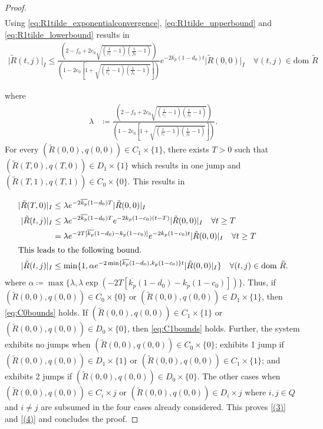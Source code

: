 \documentclass{article}
\newcommand{\dom}{\text{dom }}
\newcommand{\brackets}[1]{\left(#1\right)}
\newcommand{\Rtilde}{\tilde{R}}
\newcommand{\normSOthree}[1]{{{\vert}#1 {\vert}_I}}
\newcommand{\expo}[1]{e^{#1}}
\begin{document}
\begin{proof}
\begin{align}
\end{align}
Using \eqref{eq:R1tilde_exponentialconvergence}, \eqref{eq:R1tilde_upperbound} and \eqref{eq:R1tilde_lowerbound} results in
\begin{align}
    \normSOthree{\Rtilde(t,j)} \leq \frac{\brackets{2 - f_0 + 2e_0\sqrt{\brackets{\frac{1}{c_1}-1}\brackets{\frac{1}{f_0}-1}}}}{\brackets{1 - 2e_0\left[1 + \sqrt{\brackets{\frac{1}{c_1}-1}\brackets{\frac{1}{f_0}-1}}\right]}} \expo{-2\overline{k_p}(1-d_0)t}\normSOthree{\Rtilde(0,0)} \quad \forall (t,j)\in \dom \Rtilde
\end{align}
\begin{flushleft}
where 
\begin{align}
    \lambda &\coloneqq \frac{\brackets{2 - f_0 + 2e_0\sqrt{\brackets{\frac{1}{c_1}-1}\brackets{\frac{1}{f_0}-1}}}}{\brackets{1 - 2e_0\left[1 + \sqrt{\brackets{\frac{1}{c_1}-1}\brackets{\frac{1}{f_0}-1}}\right]}}. \label{eq:lambda}
\end{align}
For every ${(\Rtilde(0,0), q(0,0))}\in C_1\times\{1\}$, there exists $T > 0$ such that ${(\Rtilde(T,0), q(T,0))}\in D_1\times\{1\}$ which results in one jump and ${(\Rtilde(T,1), q(T,1))}\in C_0\times\{0\}$. This results in
\end{flushleft}
\begin{align}
    \normSOthree{\Rtilde(T,0)}&\leq \lambda \expo{-2\overline{k_p}(1-d_0)T}\normSOthree{\Rtilde(0,0)}\nonumber\\
    \normSOthree{\Rtilde(t,j)} &\leq \lambda \expo{-2\overline{k_p}(1-d_0)T} \expo{-2k_p(1-c_0)(t-T)}\normSOthree{\Rtilde(0,0)} \quad \forall t \geq T\nonumber\\
    &= \lambda \expo{-2T[\overline{k_p}(1-d_0) - k_p(1-c_0)]}\expo{-2k_p(1-c_0)t}\normSOthree{\Rtilde(0,0)} \quad \forall t\geq T\nonumber\\
    \intertext{This leads to the following bound.}
    \normSOthree{\Rtilde(t,j)}&\leq \min\{1, \alpha\expo{-2\min\{\overline{k_p}(1-d_0), k_p(1-c_0)\} t}\normSOthree{\Rtilde(0,0)}\} \quad \forall (t,j) \in \dom\Rtilde. \label{eq:C1bounds}
    \end{align}
where $\alpha \coloneqq \max\{\lambda, \lambda \exp{(-2T[\overline{k_p}(1-d_0) - k_p(1-c_0)])}\}$. Thus, if ${(\Rtilde(0,0), q(0,0))}\in C_0\times\{0\}$ or ${(\Rtilde(0,0), q(0,0))}\in D_1\times\{1\}$, then \eqref{eq:C0bounds} holds. If ${(\Rtilde(0,0), q(0,0))}\in C_1\times\{1\}$ or ${(\Rtilde(0,0), q(0,0))}\in D_0\times\{0\}$, then \eqref{eq:C1bounds} holds. Further, the system exhibits no jumps when ${(\Rtilde(0,0), q(0,0))}\in C_0\times\{0\}$; exhibits 1 jump if ${(\Rtilde(0,0), q(0,0))}\in D_1\times\{1\}$ or ${(\Rtilde(0,0), q(0,0))}\in C_1\times\{1\}$; and exhibits 2 jumps if ${(\Rtilde(0,0), q(0,0))}\in D_0\times\{0\}$. The other cases when $(\Rtilde(0,0), q(0,0))\in C_i\times j$ or $(\Rtilde(0,0), q(0,0))\in D_i\times j$ where $i,j\in Q$ and $i\neq j$ are subsumed in the four cases already considered. This proves \eqref{(3)} and \eqref{(4)} and concludes the proof. 
\end{proof}
\end{document}
